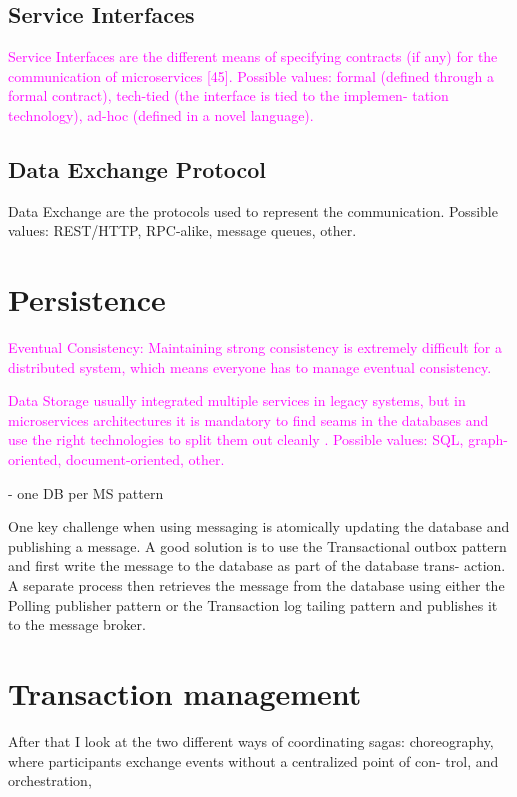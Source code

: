 \documentclass[thesis=M,english,hidelinks]{FITthesis}[2012/10/20]
\begin{document}
\subsection{Service Interfaces}
\textcolor{magenta}{Service Interfaces are the different means of specifying contracts (if any) for the communication of microservices [45]. Possible values: formal (defined through a formal contract), tech-tied (the interface is tied to the implemen- tation technology), ad-hoc (defined in a novel language).}


\subsection{Data Exchange Protocol}
Data Exchange are the protocols used to represent the communication. Possible values: REST/HTTP, RPC-alike, message queues, other.

% 
% 
\section{Persistence}

\textcolor{magenta}{Eventual Consistency: Maintaining strong consistency is extremely difficult for a distributed system, which means everyone has to manage eventual consistency.}

\textcolor{magenta}{Data Storage usually integrated multiple services in legacy systems, but in microservices architectures it is mandatory to find seams in the databases and use the right technologies to split them out cleanly \cite{ms-building-ms}. Possible values: SQL, graph-oriented, document-oriented, other.}

- one DB per MS pattern 

One key challenge when using messaging is atomically updating the database and publishing a message. A good solution is to use the Transactional outbox pattern and first write the message to the database as part of the database trans- action. A separate process then retrieves the message from the database using either the Polling publisher pattern or the Transaction log tailing pattern and publishes it to the message broker.

% 
% 
\section{Transaction management}
\label{sec:transaction_management}
After that I look at the two different ways of coordinating sagas: choreography, where participants exchange events without a centralized point of con- trol, and orchestration, 
\end{document}
